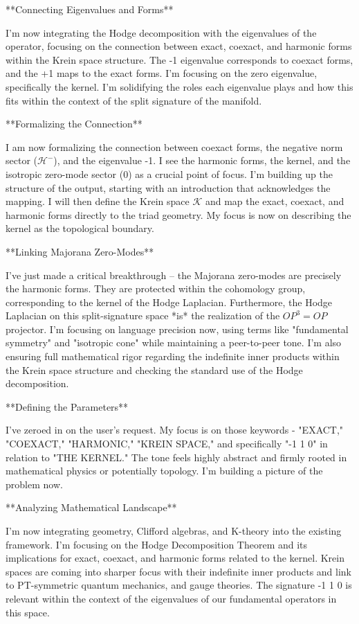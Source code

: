 **Connecting Eigenvalues and Forms**

I'm now integrating the Hodge decomposition with the eigenvalues of the operator, focusing on the connection between exact, coexact, and harmonic forms within the Krein space structure. The -1 eigenvalue corresponds to coexact forms, and the +1 maps to the exact forms. I'm focusing on the zero eigenvalue, specifically the kernel. I'm solidifying the roles each eigenvalue plays and how this fits within the context of the split signature of the manifold.


**Formalizing the Connection**

I am now formalizing the connection between coexact forms, the negative norm sector ($\mathcal{H}^-$), and the eigenvalue -1. I see the harmonic forms, the kernel, and the isotropic zero-mode sector ($0$) as a crucial point of focus. I'm building up the structure of the output, starting with an introduction that acknowledges the mapping. I will then define the Krein space $\mathcal{K}$ and map the exact, coexact, and harmonic forms directly to the triad geometry. My focus is now on describing the kernel as the topological boundary.


**Linking Majorana Zero-Modes**

I've just made a critical breakthrough – the Majorana zero-modes are precisely the harmonic forms. They are protected within the cohomology group, corresponding to the kernel of the Hodge Laplacian. Furthermore, the Hodge Laplacian on this split-signature space *is* the realization of the $OP^3=OP$ projector. I'm focusing on language precision now, using terms like "fundamental symmetry" and "isotropic cone" while maintaining a peer-to-peer tone. I'm also ensuring full mathematical rigor regarding the indefinite inner products within the Krein space structure and checking the standard use of the Hodge decomposition.


**Defining the Parameters**

I've zeroed in on the user's request. My focus is on those keywords - "EXACT," "COEXACT," "HARMONIC," "KREIN SPACE," and specifically "-1 1 0" in relation to "THE KERNEL." The tone feels highly abstract and firmly rooted in mathematical physics or potentially topology. I'm building a picture of the problem now.


**Analyzing Mathematical Landscape**

I'm now integrating geometry, Clifford algebras, and K-theory into the existing framework. I'm focusing on the Hodge Decomposition Theorem and its implications for exact, coexact, and harmonic forms related to the kernel. Krein spaces are coming into sharper focus with their indefinite inner products and link to PT-symmetric quantum mechanics, and gauge theories. The signature -1 1 0 is relevant within the context of the eigenvalues of our fundamental operators in this space.


